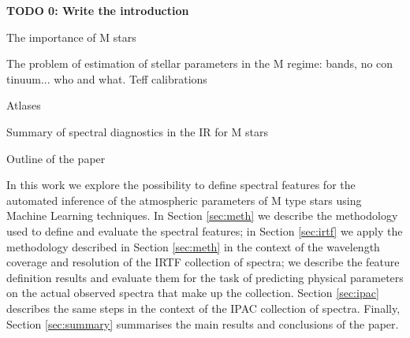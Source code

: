 
{\bf TODO 0: Write the introduction}

 The importance of M stars

 The problem of estimation of stellar parameters in the M regime: bands, no con
tinuum...
 who and what. Teff calibrations
 \cite{rajpurohit}
 \cite{amelia}

 Atlases 
\cite{2013arXiv1306.3709B} %
\cite{2009ApJS..185..289R} %

\cite{2012ApJ...748...93R} %

 Summary of spectral diagnostics in the IR for M stars

 Outline of the paper

In this work we explore the possibility to define spectral features
for the automated inference of the atmospheric parameters of M type
stars using Machine Learning techniques. In Section \ref{sec:meth} we
describe the methodology used to define and evaluate the spectral
features; in Section \ref{sec:irtf} we apply the methodology described
in Section \ref{sec:meth} in the context of the wavelength coverage
and resolution of the IRTF collection of spectra; we describe the
feature definition results and evaluate them for the task of
predicting physical parameters on the actual observed spectra that
make up the collection. Section \ref{sec:ipac} describes the same
steps in the context of the IPAC collection of spectra. Finally,
Section \ref{sec:summary} summarises the main results and conclusions
of the paper.
